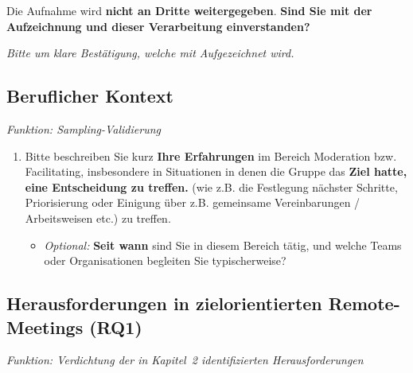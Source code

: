 Die Aufnahme wird \textbf{nicht an Dritte weitergegeben}. \textbf{Sind Sie mit der Aufzeichnung und dieser
Verarbeitung einverstanden?}

\textit{Bitte um klare Bestätigung, welche mit Aufgezeichnet wird.}

\clearpage

\subsection*{Beruflicher Kontext}
\textit{Funktion: Sampling-Validierung}

\begin{enumerate}[label=1.\arabic*, leftmargin=*]
  \item Bitte beschreiben Sie kurz \textbf{Ihre Erfahrungen} im Bereich Moderation bzw. Facilitating, insbesondere in
    Situationen in denen die Gruppe das \textbf{Ziel hatte, eine Entscheidung zu treffen.} (wie z.B. die Festlegung
    nächster Schritte, Priorisierung oder Einigung über z.B. gemeinsame Vereinbarungen / Arbeitsweisen etc.) zu treffen.
    \begin{itemize}[label=\textendash]
      \item \textit{Optional:} \textbf{Seit wann} sind Sie in diesem Bereich tätig, und welche Teams oder
        Organisationen begleiten Sie typischerweise?
    \end{itemize}
\end{enumerate}

\subsection*{Herausforderungen in zielorientierten Remote-Meetings (RQ1)}
\textit{Funktion: Verdichtung der in Kapitel~2 identifizierten Herausforderungen}

